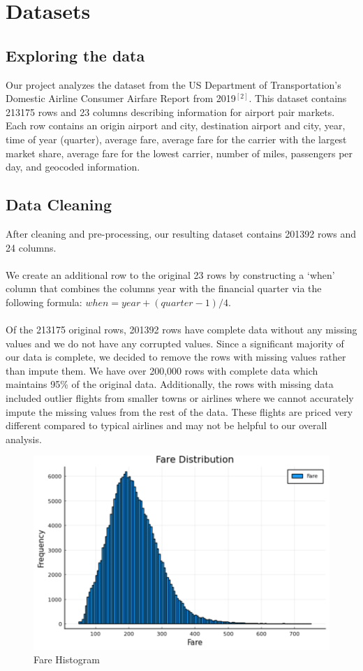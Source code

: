 \documentclass{article}
\begin{document}
\section{Datasets}
\subsection{Exploring the data}

Our project analyzes the dataset from the US Department of Transportation’s Domestic Airline Consumer Airfare Report from 2019$^{[2]}$. This dataset contains 213175 rows and 23 columns describing information for airport pair markets. Each row contains an origin airport and city, destination airport and city, year, time of year (quarter), average fare, average fare for the carrier with the largest market share, average fare for the lowest carrier, number of miles, passengers per day, and geocoded information.

\subsection{Data Cleaning}
After cleaning and pre-processing, our resulting dataset contains 201392 rows and 24 columns.\\\\
We create an additional row to the original 23 rows by constructing a ‘when’ column that combines the columns year with the financial quarter via the following formula: $when = year + (quarter - 1)/4$. \\\\
Of the 213175 original rows, 201392 rows have complete data without any missing values and we do not have any corrupted values. Since a significant majority of our data is complete, we decided to remove the rows with missing values rather than impute them. We have over 200,000 rows with complete data which maintains 95\% of the original data. Additionally, the rows with missing data included outlier flights from smaller towns or airlines where we cannot accurately impute the missing values from the rest of the data. These flights are priced very different compared to typical airlines and may not be helpful to our overall analysis.

 \begin{figure}[h]
\centering
\includegraphics[scale=.5]{images/hist_plot.png}
\caption{Fare Histogram}
\end{figure}
\end{document}
